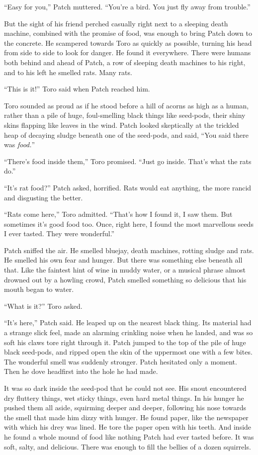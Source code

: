 \documentclass[12pt]{memoir}
\begin{document}
“Easy for you,” Patch muttered. “You’re a bird. You just fly away from
trouble.”

But the sight of his friend perched casually right next to a sleeping
death machine, combined with the promise of food, was enough to bring
Patch down to the concrete. He scampered towards Toro as quickly as
possible, turning his head from side to side to look for danger. He
found it everywhere. There were humans both behind and ahead of Patch,
a row of sleeping death machines to his right, and to his left he
smelled rats. Many rats.

“This is it!” Toro said when Patch reached him.

Toro sounded as proud as if he stood before a hill of acorns as high
as a human, rather than a pile of huge, foul-smelling black things
like seed-pods, their shiny skins flapping like leaves in the
wind. Patch looked skeptically at the trickled heap of decaying sludge
beneath one of the seed-pods, and said, “You said there was
\textit{food.}”

“There’s food inside them,” Toro promised. “Just go inside. That’s
what the rats do.”

“It’s rat food?” Patch asked, horrified. Rats would eat anything, the
more rancid and disgusting the better.

“Rats come here,” Toro admitted. “That’s how I found it, I saw
them. But sometimes it’s good food too. Once, right here, I found the
most marvellous seeds I ever tasted. They were wonderful.”

Patch sniffed the air. He smelled bluejay, death machines, rotting
sludge and rats. He smelled his own fear and hunger. But there was
something else beneath all that. Like the faintest hint of wine in
muddy water, or a musical phrase almost drowned out by a howling
crowd, Patch smelled something so delicious that his mouth began to
water.

“What is it?” Toro asked.

“It’s here,” Patch said. He leaped up on the nearest black thing. Its
material had a strange slick feel, made an alarming crinkling noise
when he landed, and was so soft his claws tore right through it. Patch
jumped to the top of the pile of huge black seed-pods, and ripped open
the skin of the uppermost one with a few bites. The wonderful smell
was suddenly stronger. Patch hesitated only a moment. Then he dove
headfirst into the hole he had made.

It was so dark inside the seed-pod that he could not see. His snout
encountered dry fluttery things, wet sticky things, even hard metal
things. In his hunger he pushed them all aside, squirming deeper and
deeper, following his nose towards the smell that made him dizzy with
hunger. He found paper, like the newspaper with which his drey was
lined. He tore the paper open with his teeth. And inside he found a
whole mound of food like nothing Patch had ever tasted before. It was
soft, salty, and delicious. There was enough to fill the bellies of a
dozen squirrels.
\end{document}
